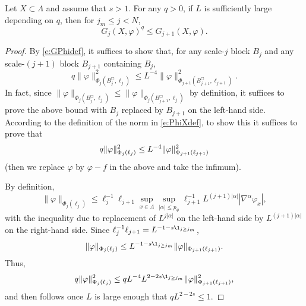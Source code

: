 \begin{lemma}
\label{lem:mart}
Let $X \subset \Lambda$ and assume that $s > 1$.
For any $q >0$, if $L$ is sufficiently large depending on $q$, then for $j_m \leq j < N$,
\begin{equation}
\label{e:mart}
    G_{j}(X, \varphi)^{q}
    \le
    G_{j+1}(X, \varphi).
\end{equation}
\end{lemma}
\begin{proof}
By \eqref{e:GPhidef}, it suffices to show that, for any scale-$j$ block $B_j$ and any scale-$(j+1)$ block $B_{j+1}$ containing $B_j$,
\begin{equation}
q \|\varphi\|^2_{\Phi_j (B_j^\Box,\ell_j )}
\leq
L^{-4} \|\varphi\|^2_{\Phi_{j+1} (B_{j+1}^\Box,\ell_{j+1})}.
\end{equation}
In fact, since $\|\varphi\|_{\Phi_j (B_j^\Box,\ell_j )}
\leq \|\varphi\|_{\Phi_j (B_{j+1}^\Box,\ell_j )}$ by definition,
it suffices to prove the above bound with $B_j$ replaced by $B_{j+1}$ on the left-hand side.
According to the definition of the norm in \eqref{e:PhiXdef},
to show this it suffices to prove that
\begin{equation}
\lbeq{martwant}
q \|\varphi\|_{\Phi_j(\ell_j)}^2 \leq L^{-4} \|\varphi\|_{\Phi_{j+1}(\ell_{j+1})}^2
\end{equation}
(then we replace $\varphi$ by $\varphi -f$ in the above and take the infimum).

By definition,
\begin{equation}
\|\varphi\|_{\Phi_j(\ell_j)}
\le
\ell_j^{-1} \ell_{j+1}
\sup_{x\in \Lambda} \sup_{|\alpha| \leq p_\Phi}
\ell_{j+1}^{-1}
L^{(j+1) |\alpha|}
|\nabla^\alpha \varphi_x|,
\end{equation}
with the inequality due to replacement of $L^{j |\alpha|}$ on the left-hand
side by $L^{(j+1) |\alpha|}$ on the right-hand side.
Since $\ell_j^{-1} \ell_{j+1} = L^{-1 - s \1_{j \geq j_m}}$,
\begin{equation}
\|\varphi\|_{\Phi_j(\ell_j)} \leq L^{-1 - s \1_{j \geq j_m}} \|\varphi\|_{\Phi_{j+1}(\ell_{j+1})}.
\end{equation}
Thus,
\begin{equation}
q \|\varphi\|_{\Phi_j(\ell_j)}^2
\leq q L^{-4} L^{2 - 2s \1_{j \geq j_m}} \|\varphi\|^2_{\Phi_{j+1}(\ell_{j+1})},
\end{equation}
and then 
follows once $L$ is large enough that $q L^{2 - 2s} \leq 1$.
\end{proof}

